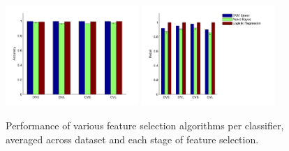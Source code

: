 \begin{figure}[tbp!]
\centering
\includegraphics[width=0.45\textwidth]{./figures/class_perf/Accuracy.pdf}
\includegraphics[width=0.45\textwidth]{./figures/class_perf/Recall.pdf}
\caption{\footnotesize Performance of various feature selection algorithms per classifier, averaged across dataset and each stage of feature selection.}
\label{fig:perf_vs_classifier}
\end{figure}

